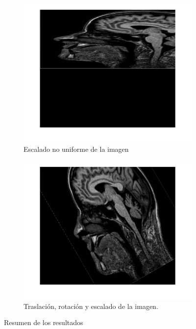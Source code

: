 \documentclass[11pt, letterpaper]{article}
\begin{document}
\begin{figure}[h!]
	\begin{subfigure}[b]{0.45\textwidth}
		\includegraphics[width=\textwidth]{IMG/R3.jpg}
		\caption{Escalado no uniforme de la imagen}
		\label{fig:r3}
	\end{subfigure}\hfill
	\begin{subfigure}[b]{0.45\textwidth}
		\includegraphics[width=\textwidth]{IMG/R4.jpg}
		\caption{Traslación, rotación y escalado de la imagen.}
		\label{fig:r4}
	\end{subfigure}
	\caption{Resumen de los resultados}
	\label{fig:cuadro_r}
\end{figure}
\end{document}
